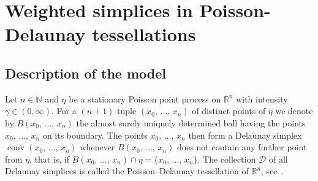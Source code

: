 \documentclass[10pt]{amsart}
\theoremstyle{definition}\newtheorem{defi}[theo]{Definition}\newtheorem{rema}[theo]{Remark}\newtheorem{exam}[theo]{Example}\newtheorem{exem}[theo]{Example}\newtheorem{nota}[theo]{Notation}
\newcommand{\R}{\mathbb{R}}
\newcommand{\N}{\mathbb{N}}
\newcommand{\dscr}{\mathcal{D}}
\newcommand{\conv}{\mathop{\mathrm{conv}}\nolimits}
\begin{document}
\section{Weighted simplices in Poisson-Delaunay tessellations}\label{sec:Del}

\subsection{Description of the model}

Let $n\in\N$ and $\eta$ be a stationary Poisson point process on $\R^n$ with intensity $\gamma\in(0,\infty)$. For a $(n+1)$-tuple $(x_0,\,\ldots,\,x_n)$ of distinct points of $\eta$ we denote by $B(x_0,\,\ldots,\,x_n)$ the almost surely uniquely determined ball having the points $x_0,\,\ldots,\,x_n$ on its boundary. The points $x_0,\,\ldots,\,x_n$ then form a Delaunay simplex $\conv(x_0,\,\ldots,\,x_n)$ whenever $B(x_0,\,\ldots,\,x_n)$ does not contain any further point from $\eta$, that is, if $B(x_0,\,\ldots,\,x_n)\cap\eta=\{x_0,\,\ldots,\,x_n\}$. The collection $\dscr$ of all Delaunay simplices is called the Poisson--Delaunay tessellation of $\R^n$, see~\cite[Section~10.2]{SW08}.
\end{document}
